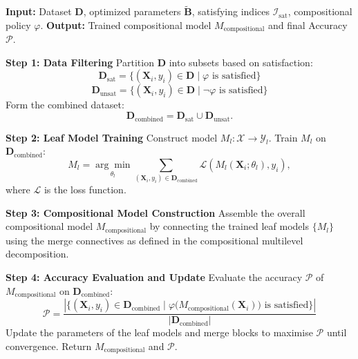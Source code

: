 \begin{algorithm}[htbp]
   \caption{Compositional Policy-Based Training}
   \begin{algorithmic}[1]
   \State \textbf{Input:} Dataset $\mathcal{\mathbf{D}}$, optimized parameters $\tilde{\mathbf{B}}$, satisfying indices $\mathcal{I}_{\text{sat}}$, compositional policy $\varphi$.
   \State \textbf{Output:} Trained compositional model $M_{\text{compositional}}$ and final Accuracy $\mathcal{P}$.
      
   \State \textbf{Step 1: Data Filtering}
   \State Partition $\mathcal{\mathbf{D}}$ into subsets based on satisfaction:
      \[
   \mathcal{\mathbf{D}}_{\text{sat}} = \{(\mathbf{X}_i, y_i) \in \mathcal{\mathbf{D}} \mid \varphi \text{ is satisfied}\} 
      \]
      \[
   \mathcal{\mathbf{D}}_{\text{unsat}} = \{(\mathbf{X}_i, y_i) \in \mathcal{\mathbf{D}} \mid \neg \varphi \text{ is satisfied}\}
      \]
   \State Form the combined dataset:
      \[
   \mathcal{\mathbf{D}}_{\text{combined}} = \mathcal{\mathbf{D}}_{\text{sat}} \cup \mathcal{\mathbf{D}}_{\text{unsat}}.
      \]
      
   \State \textbf{Step 2: Leaf Model Training}
   \State Construct model $M_l \colon \mathcal{X} \to \mathcal{Y}_l$.
   \State Train $M_l$ on $\mathcal{\mathbf{D}}_{\text{combined}}$:
          \[
   M_l = \underset{\theta_l}{\arg\min} \sum_{(\mathbf{X}_i, y_i) \in \mathcal{\mathbf{D}}_{\text{combined}}} \mathcal{L}(M_l(\mathbf{X}_i; \theta_l), y_i),
          \]
   where $\mathcal{L}$ is the loss function.
   \EndFor
      
   \State \textbf{Step 3: Compositional Model Construction}
   \State Assemble the overall compositional model $M_{\text{compositional}}$ by connecting the trained leaf models $\{M_l\}$ using the merge connectives as defined in the compositional multilevel decomposition.
      
   \State \textbf{Step 4: Accuracy Evaluation and Update}
   \State Evaluate the accuracy $\mathcal{P}$ of $M_{\text{compositional}}$ on $\mathcal{\mathbf{D}}_{\text{combined}}$:
      \[
   \mathcal{P} = \frac{|\{(\mathbf{X}_i, y_i) \in \mathcal{\mathbf{D}}_{\text{combined}} \mid \varphi\bigl(M_{\text{compositional}}(\mathbf{X}_i)\bigr) \text{ is satisfied}\}|}{|\mathcal{\mathbf{D}}_{\text{combined}}|}
      \]
   \State Update the parameters of the leaf models and merge blocks to maximise $\mathcal{P}$ until convergence.
  \State Return $M_{\text{compositional}}$ and $\mathcal{P}$.
   \end{algorithmic}
      \label{alg:compositional_training_2}
  \end{algorithm}
  
